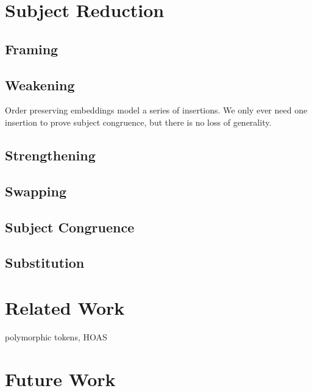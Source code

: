 \documentclass[a4paper,UKenglish,cleveref, autoref, thm-restate,authorcolumns]{lipics-v2019}
\begin{document}
\section{Subject Reduction}\label{subject-reduction}

\subsection{Framing}


\subsection{Weakening}

Order preserving embeddings model a series of insertions. We only ever need one insertion to prove subject congruence, but there is no loss of generality.

\subsection{Strengthening}

\subsection{Swapping}

\subsection{Subject Congruence}\label{subject-congruence}

\subsection{Substitution}

\section{Related Work}

\cite{previous-work} polymorphic tokens, HOAS

\cite{typing-with-leftovers}

\cite{Higher-inductive-types-for-congruence}

\cite{LTS-semantics}

\cite{work-on-session-types}


\section{Future Work}
\end{document}
